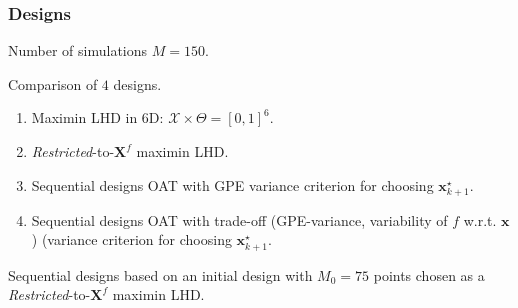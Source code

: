 \documentclass[nopagenumber,9pt]{beamer}
\newcommand{\mb}[1]{\mathbf{#1}}
\begin{document}
\begin{frame}
 \frametitle{Designs}
 
 Number of simulations $M=150$.
 \\
 
 \bigskip
 
 Comparison of $4$ designs.
 
 
 \begin{enumerate}
  \item Maximin LHD in 6D: $\mathcal{X}\times\Theta=[0,1]^{6}$.
  
  \smallskip
  \item \textit{Restricted}-to-$\mb{X}^{f}$ maximin LHD.
  
  \smallskip
  \item Sequential designs OAT with GPE variance criterion for choosing $\mathbf{x}_{k+1}^{\star}$.
  
  
  \smallskip
  \item Sequential designs OAT with trade-off (GPE-variance, variability of $f$ w.r.t. $\mb{x}$) (variance criterion for choosing $\mathbf{x}_{k+1}^{\star}$.
  
 
 \end{enumerate}

 
 Sequential designs based on an initial design with $M_0=75$ points chosen as a \textit{Restricted}-to-$\mb{X}^{f}$ maximin LHD.
\end{frame}
\end{document}
